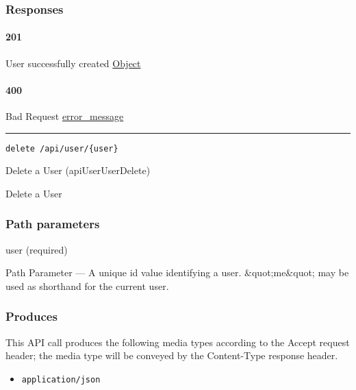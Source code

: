 \hypertarget{responses-128}{%
\subsubsection{Responses}\label{responses-128}}

\hypertarget{section-417}{%
\paragraph{201}\label{section-417}}

User successfully created \protect\hyperlink{Object}{Object}

\hypertarget{section-418}{%
\paragraph{400}\label{section-418}}

Bad Request \protect\hyperlink{error_message}{error\_message}

\begin{center}\rule{0.5\linewidth}{\linethickness}\end{center}

\protect\hypertarget{apiUserUserDelete}{}{}

\begin{verbatim}
delete /api/user/{user}
\end{verbatim}

Delete a User ({apiUserUserDelete})

Delete a User

\hypertarget{path-parameters-67}{%
\subsubsection{Path parameters}\label{path-parameters-67}}

user (required)

{Path Parameter} --- A unique id value identifying a user.
\&quot;me\&quot; may be used as shorthand for the current user.

\hypertarget{produces-126}{%
\subsubsection{Produces}\label{produces-126}}

This API call produces the following media types according to the
{Accept} request header; the media type will be conveyed by the
{Content-Type} response header.

\begin{itemize}
\tightlist
\item
  \texttt{application/json}
\end{itemize}

